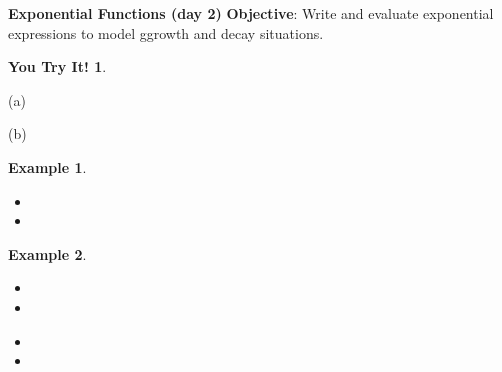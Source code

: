 \documentclass{report}
\theoremstyle{definition}
\newtheorem{example}{\bf Example}
\newtheorem{youtry}{\bf You Try It!}
\begin{document}
\begin{itemize}
	\begin{minipage}[t]{0.45\linewidth}
		\item[(a)] 
		
		\item[(b)]	
	\end{minipage}
	\begin{minipage}[t]{0.45\linewidth}
		\item[(c)] 
		
		\item[(d)] 
		
	\end{minipage}
\end{itemize}
\vfill

 \noindent{} \hfill 
 \newpage

\noindent\Large{\textbf{Exponential Functions (day 2)}}  \indent\hfill\small\noindent \textbf{Objective}: Write and evaluate exponential expressions to model ggrowth and decay situations.\normalsize\\

\begin{youtry}
\end{youtry}

\begin{minipage}[t]{0.45\linewidth}
(a) 
\end{minipage}
\hfill
\begin{minipage}[t]{0.45\linewidth}
(b) 
\end{minipage}
\vfill

\begin{example}
\end{example}
\begin{itemize}
	\item[(a)] 
	\vfill
	\item[(b)] 
	\vfill
\end{itemize}

\begin{example}
\end{example}


\begin{minipage}[t]{0.45\linewidth}
	\begin{itemize}
		\item[(a)] 
		\vspace{1cm}
		\item[(c)] 
	\end{itemize}
\end{minipage}
\begin{minipage}[t]{0.45\linewidth}
	\begin{itemize}
		\item[(b)] 
		\vspace{1cm}
		\item[(d)] 
	\end{itemize}
\end{minipage}
\vfill
\end{document}
